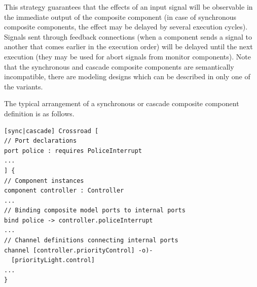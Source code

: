 This strategy guarantees that the effects of an input signal will be observable in the immediate output of the composite component (in case of synchronous composite components, the effect may be delayed by several execution cycles). Signals sent through feedback connections (\ie when a component sends a signal to another that comes earlier in the execution order) will be delayed until the next execution (they may be used for \eg abort signals from monitor components). Note that the synchronous and cascade composite components are semantically incompatible, \ie there are modeling designs which can be described in only one of the variants.

The typical arrangement of a synchronous or cascade composite component definition is as follows.
\begin{lstlisting}
[sync|cascade] Crossroad [
// Port declarations
port police : requires PoliceInterrupt
...
] {
// Component instances
component controller : Controller
...
// Binding composite model ports to internal ports
bind police -> controller.policeInterrupt
...
// Channel definitions connecting internal ports
channel [controller.priorityControl] -o)-
  [priorityLight.control]
...
}
\end{lstlisting}

